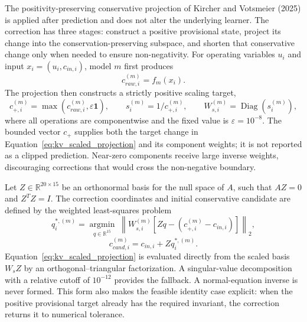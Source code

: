 \documentclass[a4paper,fleqn]{cas-sc}
\begin{document}
The positivity-preserving conservative projection of Kircher and Votsmeier (2025) is applied after prediction and does not alter the underlying learner. The correction has three stages: construct a positive provisional state, project its change into the conservation-preserving subspace, and shorten that conservative change only when needed to ensure non-negativity. For operating variables $u_i$ and input $x_i=(u_i,c_{in,i})$, model $m$ first produces
\begin{equation}
\label{eq:raw_component_prediction}
c_{raw,i}^{(m)}=f_m(x_i).
\end{equation}
The projection then constructs a strictly positive scaling target,
\begin{equation}
\label{eq:positive_scaling}
c_{+,i}^{(m)}=\max\!\left(c_{raw,i}^{(m)},\varepsilon\mathbf{1}\right),\qquad
s_i^{(m)}=1/c_{+,i}^{(m)},\qquad
W_{s,i}^{(m)}=\operatorname{Diag}\!\left(s_i^{(m)}\right),
\end{equation}
where all operations are componentwise and the fixed value is $\varepsilon=10^{-8}$. The bounded vector $c_+$ supplies both the target change in Equation~\eqref{eq:kv_scaled_projection} and its component weights; it is not reported as a clipped prediction. Near-zero components receive large inverse weights, discouraging corrections that would cross the non-negative boundary.

Let $Z\in\mathbb{R}^{20\times15}$ be an orthonormal basis for the null space of $A$, such that $AZ=0$ and $Z^TZ=I$. The correction coordinates and initial conservative candidate are defined by the weighted least-squares problem
\begin{equation}
\label{eq:kv_scaled_projection}
q_i^{*,(m)}=\underset{q\in\mathbb{R}^{15}}{\operatorname{argmin}}\;
\left\|W_{s,i}^{(m)}\left[Zq-\left(c_{+,i}^{(m)}-c_{in,i}\right)\right]\right\|_2,
\end{equation}
\begin{equation}
\label{eq:corrected_component_prediction}
c_{cand,i}^{(m)}=c_{in,i}+Zq_i^{*,(m)}.
\end{equation}
Equation~\eqref{eq:kv_scaled_projection} is evaluated directly from the scaled basis $W_sZ$ by an orthogonal--triangular factorization. A singular-value decomposition with a relative cutoff of $10^{-12}$ provides the fallback. A normal-equation inverse is never formed. This form also makes the feasible identity case explicit: when the positive provisional target already has the required invariant, the correction returns it to numerical tolerance.
\end{document}
